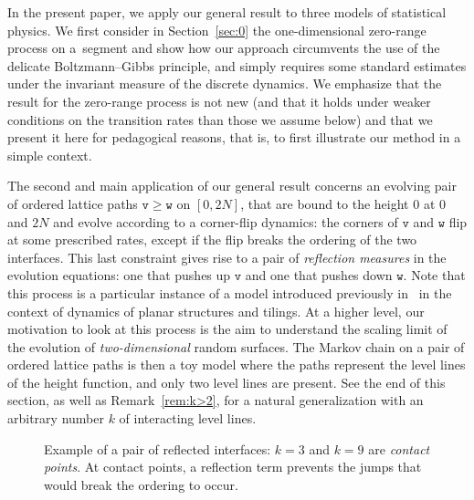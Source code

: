 \documentclass[10pt]{amsart}
\theoremstyle{definition}\newtheorem{defi}[theo]{Definition}\newtheorem{rema}[theo]{Remark}\newtheorem{exam}[theo]{Example}\newtheorem{exem}[theo]{Example}\newtheorem{nota}[theo]{Notation}
\theoremstyle{plain}
\newcommand{\ttv}{\mathtt{v}}
\newcommand{\ttw}{\mathtt{w}}
\begin{document}
In the present paper, we apply our general result to three models of statistical physics. We first consider in Section~\ref{sec:0} the one-dimensional zero-range process on a~segment and show how our approach circumvents the use of the delicate Boltzmann--Gibbs principle, and simply requires some standard estimates under the invariant measure of the discrete dynamics. We emphasize that the result for the zero-range process is not new (and that it holds under weaker conditions on the transition rates than those we assume below) and that we present it here for pedagogical reasons, that is, to first illustrate our method in a simple context.

The second and main application of our general result concerns an evolving pair of ordered lattice paths $\ttv \ge \ttw$ on $[0,2N]$, that are bound to the height $0$ at $0$ and $2N$ and evolve according to a corner-flip dynamics: the corners of $\ttv$ and $\ttw$ flip at some prescribed rates, except if the flip breaks the ordering of the two interfaces. This last constraint gives rise to a pair of
\emph{reflection measures} in the evolution equations: one that pushes up $\ttv$ and one that pushes down $\ttw$. Note that this process is a particular instance of a model introduced previously in~\cite{luby2001markov,wilson2004mixing} in the context of dynamics of planar structures and tilings. At a higher level, our motivation to look at this process is the aim to understand the scaling limit of the evolution of \emph{two-dimensional} random surfaces. The Markov chain on a pair of ordered lattice paths is then a toy model where the paths represent the level lines of the height function, and only two level lines are present. See the end of this section, as well as Remark~\ref{rem:k>2}, for a natural generalization with an arbitrary number $k$ of interacting level lines.

\begin{figure}[!htbp]
\centering
{}
\caption{Example of a pair of reflected interfaces: $k=3$ and $k=9$ are \emph{contact points}. At contact points, a reflection term prevents the jumps that would break the ordering to occur.}
\label{fig1.1}
\end{figure}
\end{document}
